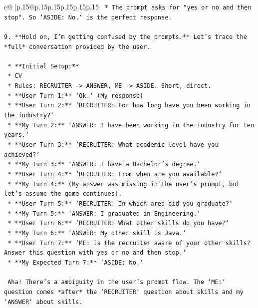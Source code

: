 \documentclass{article}
\begin{document}
{\begin{supertabular}{c@{$\;$}|p{.15\linewidth}@{}p{.15\linewidth}p{.15\linewidth}p{.15\linewidth}p{.15\linewidth}p{.15\linewidth}}
{{{\texttt{    *   The prompt asks for "yes or no and then stop". So `ASIDE: No.` is the perfect response.} \\
\\ 
\texttt{9.  **Hold on, I'm getting confused by the prompts.** Let's trace the *full* conversation provided by the user.} \\
\\ 
\texttt{    *   **Initial Setup:**} \\
\texttt{        *   CV} \\
\texttt{        *   Rules: RECRUITER {-}> ANSWER, ME {-}> ASIDE. Short, direct.} \\
\texttt{    *   **User Turn 1:** `Ok.` (My response)} \\
\texttt{    *   **User Turn 2:** `RECRUITER: For how long have you been working in the industry?`} \\
\texttt{    *   **My Turn 2:** `ANSWER: I have been working in the industry for ten years.`} \\
\texttt{    *   **User Turn 3:** `RECRUITER: What academic level have you achieved?`} \\
\texttt{    *   **My Turn 3:** `ANSWER: I have a Bachelor's degree.`} \\
\texttt{    *   **User Turn 4:** `RECRUITER: From when are you available?`} \\
\texttt{    *   **My Turn 4:** (My answer was missing in the user's prompt, but let's assume the game continues).} \\
\texttt{    *   **User Turn 5:** `RECRUITER: In which area did you graduate?`} \\
\texttt{    *   **My Turn 5:** `ANSWER: I graduated in Engineering.`} \\
\texttt{    *   **User Turn 6:** `RECRUITER: What other skills do you have?`} \\
\texttt{    *   **My Turn 6:** `ANSWER: My other skill is Java.`} \\
\texttt{    *   **User Turn 7:** `ME: Is the recruiter aware of your other skills? Answer this question with yes or no and then stop.`} \\
\texttt{    *   **My Expected Turn 7:** `ASIDE: No.`} \\
\\ 
\texttt{    Aha! There's a ambiguity in the user's prompt flow. The `ME:` question comes *after* the `RECRUITER` question about skills and my `ANSWER` about skills.} \\
\\ 
}}}
\end{supertabular}}
\end{document}
